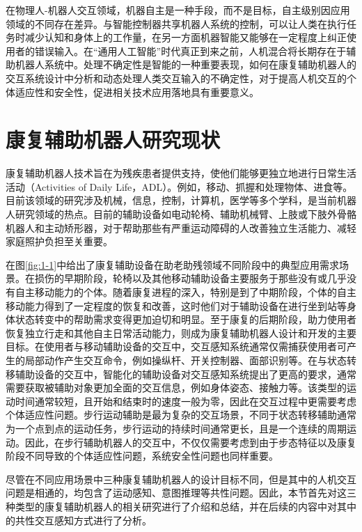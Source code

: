 在物理人-机器人交互领域，机器自主是一种手段，而不是目标，自主级别因应用领域的不同存在差异。与智能控制器共享机器人系统的控制，可以让人类在执行任务时减少认知和身体上的工作量，在另一方面机器智能又能够在一定程度上纠正使用者的错误输入。在``通用人工智能''时代真正到来之前，人机混合将长期存在于辅助机器人系统中\cite{ZhangMianXiangRenJiXuGuanJueCeDeHunHeZhiNengFangFaYanJiu2021}。处理不确定性是智能的一种重要表现，如何在康复辅助机器人的交互系统设计中分析和动态处理人类交互输入的不确定性，对于提高人机交互的个体适应性和安全性，促进相关技术应用落地具有重要意义。

\section{康复辅助机器人研究现状}
康复辅助机器人技术旨在为残疾患者提供支持，使他们能够更独立地进行日常生活活动（Activities of Daily Life，ADL）。例如，移动、抓握和处理物体、进食等。目前该领域的研究涉及机械，信息，控制，计算机，医学等多个学科，是当前机器人研究领域的热点。目前的辅助设备如电动轮椅、辅助机械臂、上肢或下肢外骨骼机器人和主动矫形器，对于帮助那些有严重运动障碍的人改善独立生活能力、减轻家庭照护负担至关重要。

在图\ref{fig:1-1}中给出了康复辅助设备在助老助残领域不同阶段中的典型应用需求场景。在损伤的早期阶段，轮椅以及其他移动辅助设备主要服务于那些没有或几乎没有自主移动能力的个体。随着康复进程的深入，特别是到了中期阶段，个体的自主移动能力得到了一定程度的恢复和改善，这时他们对于辅助设备在进行坐到站等身体状态转变中的帮助需求变得更加迫切和明显。至于康复的后期阶段，助力使用者恢复独立行走和其他自主日常活动能力，则成为康复辅助机器人设计和开发的主要目标。在使用者与移动辅助设备的交互中，交互感知系统通常仅需捕获使用者可产生的局部动作产生交互命令，例如操纵杆、开关控制器、面部识别等。在与状态转移辅助设备的交互中，智能化的辅助设备对交互感知系统提出了更高的要求，通常需要获取被辅助对象更加全面的交互信息，例如身体姿态、接触力等。该类型的运动时间通常较短，且开始和结束时的速度一般为零，因此在交互过程中更需要考虑个体适应性问题。步行运动辅助是最为复杂的交互场景，不同于状态转移辅助通常为一个点到点的运动任务，步行运动的持续时间通常更长，且是一个连续的周期运动。因此，在步行辅助机器人的交互中，不仅仅需要考虑到由于步态特征以及康复阶段不同导致的个体适应性问题，系统安全性问题也同样重要。

尽管在不同应用场景中三种康复辅助机器人的设计目标不同，但是其中的人机交互问题是相通的，均包含了运动感知、意图推理等共性问题。因此，本节首先对这三种类型的康复辅助机器人的相关研究进行了介绍和总结，并在后续的内容中对其中的共性交互感知方式进行了分析。

